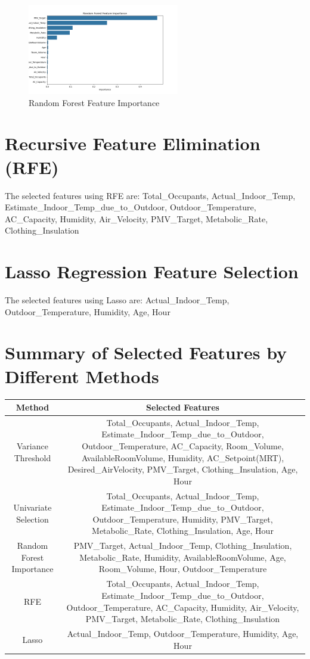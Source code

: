 \documentclass{article}%
\begin{document}
%


\begin{figure}[h!]%
\centering%
\includegraphics[width=250px]{rf_feature_importance.png}%
\caption{Random Forest Feature Importance}%
\end{figure}

%
\section{Recursive Feature Elimination (RFE)}%
\label{sec:RecursiveFeatureElimination(RFE)}%

%
The selected features using RFE are: Total\_Occupants, Actual\_Indoor\_Temp, Estimate\_Indoor\_Temp\_due\_to\_Outdoor, Outdoor\_Temperature, AC\_Capacity, Humidity, Air\_Velocity, PMV\_Target, Metabolic\_Rate, Clothing\_Insulation%
\section{Lasso Regression Feature Selection}%
\label{sec:LassoRegressionFeatureSelection}%

%
The selected features using Lasso are: Actual\_Indoor\_Temp, Outdoor\_Temperature, Humidity, Age, Hour%
\section{Summary of Selected Features by Different Methods}%
\label{sec:SummaryofSelectedFeaturesbyDifferentMethods}%

%
\begin{tabular}{|c|c|}%
\hline%
Method&Selected Features\\%
\hline%
Variance Threshold&Total\_Occupants, Actual\_Indoor\_Temp, Estimate\_Indoor\_Temp\_due\_to\_Outdoor, Outdoor\_Temperature, AC\_Capacity, Room\_Volume, AvailableRoomVolume, Humidity, AC\_Setpoint(MRT), Desired\_AirVelocity, PMV\_Target, Clothing\_Insulation, Age, Hour\\%
\hline%
Univariate Selection&Total\_Occupants, Actual\_Indoor\_Temp, Estimate\_Indoor\_Temp\_due\_to\_Outdoor, Outdoor\_Temperature, Humidity, PMV\_Target, Metabolic\_Rate, Clothing\_Insulation, Age, Hour\\%
\hline%
Random Forest Importance&PMV\_Target, Actual\_Indoor\_Temp, Clothing\_Insulation, Metabolic\_Rate, Humidity, AvailableRoomVolume, Age, Room\_Volume, Hour, Outdoor\_Temperature\\%
\hline%
RFE&Total\_Occupants, Actual\_Indoor\_Temp, Estimate\_Indoor\_Temp\_due\_to\_Outdoor, Outdoor\_Temperature, AC\_Capacity, Humidity, Air\_Velocity, PMV\_Target, Metabolic\_Rate, Clothing\_Insulation\\%
\hline%
Lasso&Actual\_Indoor\_Temp, Outdoor\_Temperature, Humidity, Age, Hour\\%
\hline%
\end{tabular}%
\end{document}
